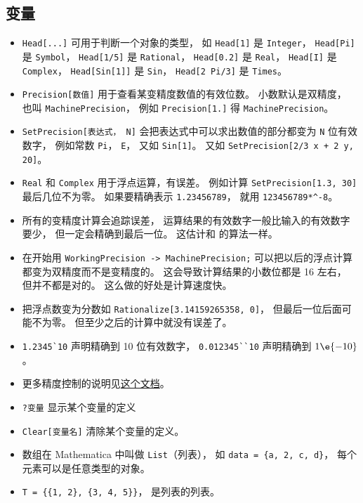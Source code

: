 \subsection{变量}
\begin{itemize}
\item \verb`Head[...]` 可用于判断一个对象的类型， 如 \verb`Head[1]` 是 \verb`Integer`， \verb`Head[Pi]` 是 \verb`Symbol`， \verb`Head[1/5]` 是 \verb`Rational`， \verb`Head[0.2]` 是 \verb`Real`， \verb`Head[I]` 是 \verb`Complex`， \verb`Head[Sin[1]]`  是 \verb`Sin`， \verb`Head[2 Pi/3]` 是 \verb`Times`。
\item \verb`Precision[数值]` 用于查看某变精度数值的有效位数。 小数默认是双精度， 也叫 \verb`MachinePrecision`， 例如 \verb`Precision[1.]` 得 \verb`MachinePrecision`。
\item \verb`SetPrecision[表达式， N]` 会把表达式中可以求出数值的部分都变为 \verb`N` 位有效数字， 例如常数 \verb`Pi`， \verb`E`， 又如 \verb`Sin[1]`。 又如 \verb`SetPrecision[2/3 x + 2 y, 20]`。
\item \verb`Real` 和 \verb`Complex` 用于浮点运算，有误差。 例如计算 \verb`SetPrecision[1.3, 30]` 最后几位不为零。 如果要精确表示 \verb`1.23456789`， 就用 \verb`123456789*^-8`。
\item 所有的变精度计算会追踪误差， 运算结果的有效数字一般比输入的有效数字要少， 但一定会精确到最后一位。 这估计和  的算法一样。
\item 在开始用 \verb`WorkingPrecision -> MachinePrecision;` 可以把以后的浮点计算都变为双精度而不是变精度的。 这会导致计算结果的小数位都是 16 左右， 但并不都是对的。 这么做的好处是计算速度快。
\item 把浮点数变为分数如 \verb`Rationalize[3.14159265358, 0]`， 但最后一位后面可能不为零。 但至少之后的计算中就没有误差了。
\item \verb|1.2345`10| 声明精确到 10 位有效数字， \verb|0.012345``10| 声明精确到 $1\e{-10}$。
\item 更多精度控制的说明见\href{https://reference.wolfram.com/language/howto/ControlThePrecisionAndAccuracyOfNumericalResults.html}{这个文档}。
\item \verb`?变量` 显示某个变量的定义
\item \verb`Clear[变量名]` 清除某个变量的定义。
\item 数组在 Mathematica 中叫做 \verb`List`（列表）， 如 \verb`data = {a, 2, c, d}`， 每个元素可以是任意类型的对象。
\item \verb`T = {{1, 2}, {3, 4, 5}}`， 是列表的列表。
\end{itemize}

